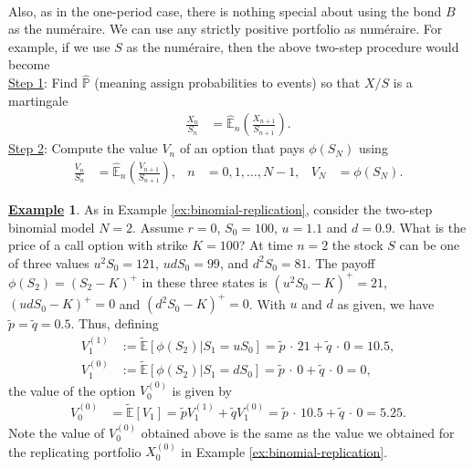 \documentclass[12pt]{book}
\numberwithin{equation}{chapter}
\theoremstyle{plain}
\numberwithin{theorem}{section}
\theoremstyle{definition}
\newtheorem{example}[theorem]{\underline{Example}}
\numberwithin{exercise}{chapter}
\newcommand{\<}{\langle}
\renewcommand{\>}{\rangle}
\renewcommand{\(}{\left(}
\renewcommand{\)}{\right)}
\renewcommand{\[}{\left[}
\renewcommand{\]}{\right]}
\newcommand\Eb{\mathds{E}}
\newcommand\Pb{\mathds{P}}
\newcommand\Pbh{\widehat{\Pb}}
\newcommand\Ebh{\widehat{\Eb}}
\newcommand\Ebt{\widetilde{\Eb}}
\newcommand\qt{\widetilde{q}}
\theoremstyle{definition}
\numberwithin{question}{section}
\newcommand\pt{\widetilde{p}}
\begin{document}
\\[0.5em]
Also, as in the one-period case, there is nothing special about using the bond $B$ as the num\'eraire.  We can use any strictly positive portfolio as num\'eraire.  For example, if we use $S$ as the num\'eraire, then the above two-step procedure would become
\\[0.5em]
\underline{Step 1}:  Find $\Pbh$ (meaning assign probabilities to events) so that $X/S$ is a martingale
\begin{align}
\frac{X_n}{S_n}
	&=	\Ebh_n \( \frac{X_{n+1}}{S_{n+1}} \) . 
\end{align}
\underline{Step 2}: Compute the value $V_n$ of an option that pays $\phi(S_N)$ using
\begin{align}
\frac{V_n}{S_n} 
	&= \Ebh_n \( \frac{V_{n+1}}{S_{n+1}} \) , &
n
	&=	0, 1, \ldots, N-1 , &
V_N
	&=	 \phi(S_N) . \label{eq:step2a-S}
\end{align}

\begin{example}
As in Example \ref{ex:binomial-replication}, consider the two-step binomial model $N=2$.  Assume $r=0$, $S_0 = 100$, $u=1.1$ and $d=0.9$.  What is the price of a call option with strike $K=100$?  At time $n = 2$ the stock $S$ can be one of three values $u^2 S_0 = 121$, $u d S_0 = 99 $, and $d^2 S_0 =81$.  The payoff $\phi(S_{2}) = (S_{2}-K)^+$ in these three states is $(u^2 S_0 - K)^+ = 21$, $(ud S_0 - K)^+=0$ and $(d^2 S_0 - K)^+=0$.  With $u$ and $d$ as given, we have $\pt = \qt = 0.5$.  Thus, defining
\begin{align}
V_{1}^{(1)} 
	&:=	\Ebt [ \phi(S_{2}) | S_{1} = u S_0 ]
	=		\pt \, \cdot \,  21 + \qt \, \cdot \,  0 = 10.5 , \\
V_{1}^{(0)} 
	&:=	\Ebt [ \phi(S_{2 }) | S_{1} = d S_0 ]
	=		\pt \, \cdot \,  0 + \qt \, \cdot \,  0 = 0 ,
\end{align}
the value of the option $V_0^{(0)}$ is given by
\begin{align}
V_0^{(0)}
	&=	\Ebt [ V_{1} ]
	=		\pt V_{1}^{(1)}  + \qt V_{1}^{(0)} 
	=		\pt \, \cdot \,  10.5 + \qt \, \cdot \,  0 
	=		5.25 .
\end{align}
Note the value of $V_0^{(0)}$ obtained above is the same as the value we obtained for the replicating portfolio $X_0^{(0)}$ in Example \ref{ex:binomial-replication}.
\end{example}
\end{document}
